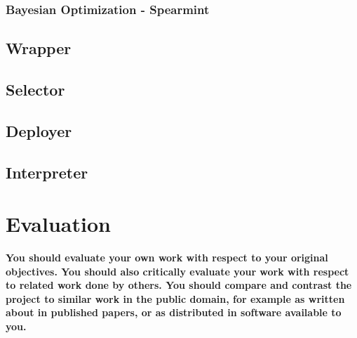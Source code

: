\documentclass{article}
\begin{document}
\subsubsection{Bayesian Optimization - Spearmint}
\subsection{Wrapper}
\subsection{Selector}
\subsection{Deployer}
\subsection{Interpreter}
\section{Evaluation}
\textbf{You should evaluate your own work with respect to your original objectives. You should also critically evaluate your work with respect to related work done by others. You should compare and contrast the project to similar work in the public domain, for example as written about in published papers, or as distributed in software available to you.}
\end{document}
